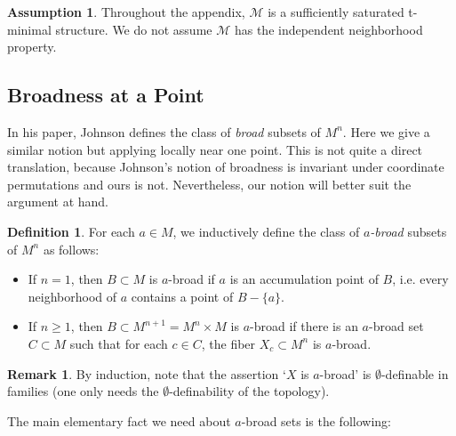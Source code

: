 \documentclass{amsart}
\theoremstyle{definition}
\newtheorem{definition}[theorem]{Definition}
\newtheorem{assumption}[theorem]{Assumption}
\newtheorem{remark}[theorem]{Remark}
\begin{document}
\begin{assumption}
    Throughout the appendix, $\mathcal M$ is a sufficiently saturated t-minimal structure. We do not assume $\mathcal M$ has the independent neighborhood property.
\end{assumption}

\subsection{Broadness at a Point}

In his paper, Johnson defines the class of \textit{broad} subsets of $M^n$. Here we give a similar notion but applying locally near one point. This is not quite a direct translation, because Johnson's notion of broadness is invariant under coordinate permutations and ours is not. Nevertheless, our notion will better suit the argument at hand.

\begin{definition}
    For each $a\in M$, we inductively define the class of \textit{$a$-broad} subsets of $M^n$ as follows:
    \begin{itemize}
        \item If $n=1$, then $B\subset M$ is $a$-broad if $a$ is an accumulation point of $B$, i.e. every neighborhood of $a$ contains a point of $B-\{a\}$.
        \item If $n\geq 1$, then $B\subset M^{n+1}=M^n\times M$ is $a$-broad if there is an $a$-broad set $C\subset M$ such that for each $c\in C$, the fiber $X_c\subset M^n$ is $a$-broad.
    \end{itemize}
\end{definition}

\begin{remark} By induction, note that the assertion `$X$ is $a$-broad' is $\emptyset$-definable in families (one only needs the $\emptyset$-definability of the topology).
\end{remark}

The main elementary fact we need about $a$-broad sets is the following:
\end{document}
